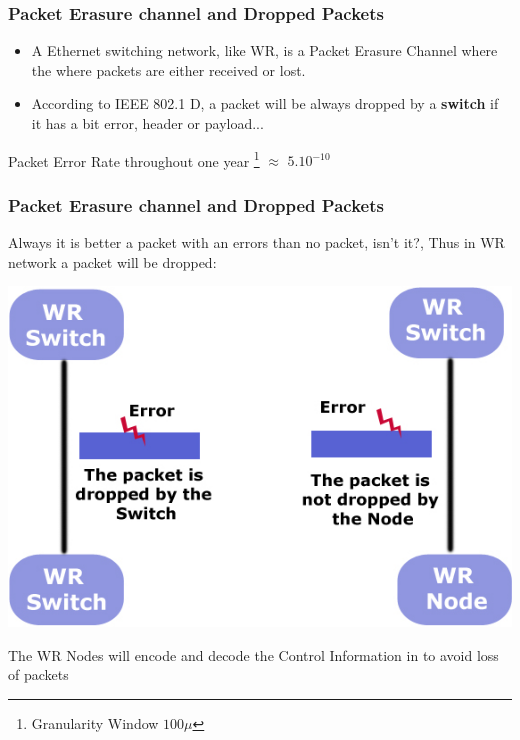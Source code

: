 \documentclass[]{beamer}
\begin{document}
\begin{frame}
\frametitle{Packet Erasure channel and Dropped Packets}

\begin{itemize}
	\item A Ethernet switching network, like WR, is a Packet Erasure Channel where the where packets are either received or lost.

\item According to IEEE 802.1 D, a packet will be always dropped by a \textbf{ switch} if it has a bit error, header or payload... 
\end{itemize}

Packet Error Rate throughout one year \footnote{Granularity Window $100\mu$}  $\approx$ $5.10^{-10}$

\end{frame}

\begin{frame}

\frametitle{Packet Erasure channel and Dropped Packets}

Always it is better a packet with an errors than no packet, isn't it?, Thus in WR network a packet will be dropped:

\begin{center}
  \includegraphics[scale=0.30]{robustness/dropped_packet}


\end{center}
The WR Nodes will encode and decode the Control Information in to avoid loss of packets
\end{frame}
\end{document}
